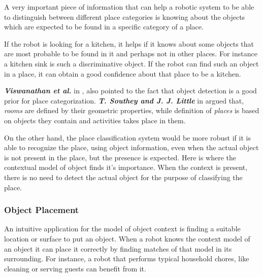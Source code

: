       A very important piece of information that can help a robotic system to be able to distinguish between different place categories 
is knowing about the objects which are expected to be found in a specific category of a place. 

If the robot is looking for a kitchen, it helps if it knows about some objects that are most probable to be found in it and 
perhaps not in other places. 
For instance a kitchen sink is such a discriminative object. 
If the robot can find such an object in a place, it can obtain a good confidence about that place to be a kitchen. 

{\bf\it Viswanathan et al.} in \cite{P.Viswanathan}, also  pointed to the fact that object detection is a good prior for place 
categorization. {\bf\it T. Southey and J. J. Little} in \cite{southey2006object} argued that, {\it rooms} are defined by their geometric 
properties, while definition of {\it places} is based on objects they contain and activities takes place in them.  

On the other hand, the place classification system would be more robust if it is able to recognize the place, using object information, 
even when the actual object is not present in the place, but the presence is expected.
Here is where the contextual model of object finds it's importance. When the context is present, there is no need to detect the actual 
object for the purpose of classifying the place.

 
 
 \subsubsection*{Object Placement} 
 
 An intuitive application for the model of object context is finding a suitable location or surface to put an object.
 When a robot knows the context model of an object it can place it correctly by finding matches of that model in its 
 surrounding.
 For instance, a robot that performs typical household chores, like cleaning or serving guests can benefit from it.  
 


